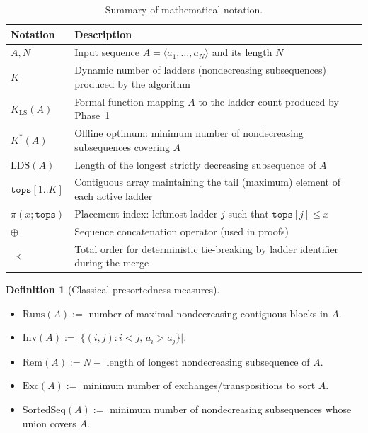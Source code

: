 \documentclass{ieeeaccess}
\theoremstyle{plain}
\theoremstyle{definition}
\newtheorem{definition}{Definition}[section]
\begin{document}
\begin{table}[t]
\centering
\caption{Summary of mathematical notation.}
\label{tab:notation}
\begin{tabularx}{\linewidth}{@{}lX@{}}
\toprule
Notation & Description \\
\midrule
$A,N$ & Input sequence $A=\langle a_1,\ldots,a_N\rangle$ and its length $N$ \\
$K$ & Dynamic number of ladders (nondecreasing subsequences) produced by the algorithm \\
$K_{\mathrm{LS}}(A)$ & Formal function mapping $A$ to the ladder count produced by Phase~1 \\
$K^*(A)$ & Offline optimum: minimum number of nondecreasing subsequences covering $A$ \\
$\mathrm{LDS}(A)$ & Length of the longest strictly decreasing subsequence of $A$ \\
$\mathtt{tops}[1..K]$ & Contiguous array maintaining the tail (maximum) element of each active ladder \\
$\pi(x;\mathtt{tops})$ & Placement index: leftmost ladder $j$ such that $\mathtt{tops}[j] \leq x$ \\
$\oplus$ & Sequence concatenation operator (used in proofs) \\
$\prec$ & Total order for deterministic tie-breaking by ladder identifier during the merge \\
\bottomrule
\end{tabularx}
\end{table}
 
\begin{definition}[Classical presortedness measures]
\label{def:measures}
\begin{itemize}[leftmargin=*,itemsep=2pt,topsep=2pt]
\item[] $\mathrm{Runs}(A) :=$ number of maximal nondecreasing contiguous blocks in $A$.
\item[] $\mathrm{Inv}(A) := \bigl|\{(i,j) : i < j,\, a_i > a_j\}\bigr|$.
\item[] $\mathrm{Rem}(A) := N - $ length of longest nondecreasing subsequence of $A$.
\item[] $\mathrm{Exc}(A) :=$ minimum number of exchanges/transpositions to sort $A$.
\item[] $\mathrm{SortedSeq}(A) :=$ minimum number of nondecreasing subsequences whose union covers $A$.
\end{itemize}
\end{definition}
 
\end{document}
